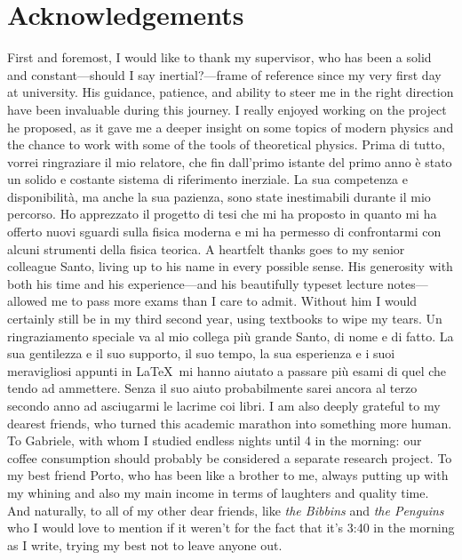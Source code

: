 \chapter{Acknowledgements}
\begin{paracol}{2}
    First and foremost, I would like to thank my supervisor, who has been a solid and constant---should I say iner\-tial?---frame of reference since my very first day at university. His guidance, patience, and ability to steer me in the right direction have been invaluable during this journey. I really enjoyed working on the project he proposed, as it gave me a deeper insight on some topics of modern physics and the chance to work with some of the tools of theoretical physics.
    \switchcolumn
    Prima di tutto, vorrei ringraziare il mio relatore, che fin dall'primo istante del primo anno è stato un solido e costante sistema di riferimento inerziale. La sua competenza e disponibilità, ma anche la sua pazienza, sono state inestimabili durante il mio percorso. Ho apprezzato il progetto di tesi che mi ha proposto in quanto mi ha offerto nuovi sguardi sulla fisica moderna e mi ha permesso di confrontarmi con alcuni strumenti della fisica teorica.
    \switchcolumn*
    A heartfelt thanks goes to my senior colleague Santo, living up to his name in every possible sense. His generosity with both his time and his experience---and his beautifully typeset lecture notes---allowed me to pass more exams than I care to admit. Without him I would certainly still be in my third second year, using textbooks to wipe my tears.
    \switchcolumn
    Un ringraziamento speciale va al mio collega più grande Santo, di nome e di fatto. La sua gentilezza e il suo supporto, il suo tempo, la sua esperienza e i suoi meravigliosi appunti in \LaTeX\ mi hanno aiutato a passare più esami di quel che tendo ad ammettere. Senza il suo aiuto probabilmente sarei ancora al terzo secondo anno ad asciugarmi le lacrime coi libri.
    \switchcolumn*
    I am also deeply grateful to my dearest friends, who turned this academic marathon into something more human. To Gabriele, with whom I studied endless nights until 4 in the morning: our coffee consumption should probably be considered a separate research project. To my best friend Porto, who has been like a brother to me, always putting up with my whining and also my main income in terms of laughters and quality time. And naturally, to all of my other dear friends, like \emph{the Bibbins} and \emph{the Penguins} who I would love to mention if it weren't for the fact that it's 3:40 in the morning as I write, trying my best not to leave anyone out.

\end{paracol}
